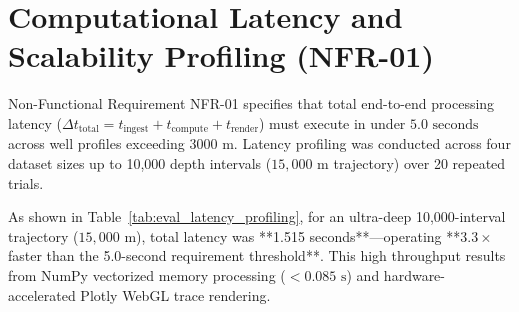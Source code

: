 \section{Computational Latency and Scalability Profiling (NFR-01)}

Non-Functional Requirement NFR-01 specifies that total end-to-end processing latency ($\Delta t_{\text{total}} = t_{\text{ingest}} + t_{\text{compute}} + t_{\text{render}}$) must execute in under $5.0\text{ seconds}$ across well profiles exceeding $3000\text{ m}$. Latency profiling was conducted across four dataset sizes up to 10,000 depth intervals ($15,000\text{ m}$ trajectory) over 20 repeated trials.

\begin{table}[H]
\centering
\caption{End-to-End Computational Latency Profiling (NFR-01 Verification)}
\label{tab:eval_latency_profiling}
\renewcommand{\arraystretch}{1.3}
\end{table}

As shown in Table~\ref{tab:eval_latency_profiling}, for an ultra-deep 10,000-interval trajectory ($15,000\text{ m}$), total latency was **1.515 seconds**—operating **$3.3\times$ faster than the 5.0-second requirement threshold**. This high throughput results from NumPy vectorized memory processing ($< 0.085\text{ s}$) and hardware-accelerated Plotly WebGL trace rendering.

